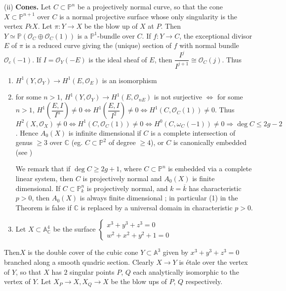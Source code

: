 (ii) \textbf{Cones.} Let $C\subset \mathbb{P}^{n}$ be a projectively normal curve, so that the cone $X\subset \mathbb{P}^{n+1}$ over $C$ is a normal projective surface whose only singularity is the vertex $P\epsilon X$. Let $\pi:Y\to X$ be the blow up of $X$ at $P$. Then $Y\simeq \mathbb{P}(\mathscr{O}_C\oplus \mathscr{O}_C(1))$ is a $\mathbb{P}^{1}$-bundle over $C$. If $f:Y\to C$, the exceptional divisor $E$ of $\pi$ is a reduced curve giving the (unique) section of $f$ with normal bundle $\mathscr{O}_c(-1)$. If $I=\mathscr{O}_Y(-E)$ is the ideal sheaf of $E$, then $\dfrac{I^{j}}{I^{j+1}}\cong\mathscr{O}_C(j)$. Thus 
\begin{enumerate}
\renewcommand{\theenumi}{\roman{enumi}}
\renewcommand{\labelenumi}{(\theenumi)}
\item $H^{1}(Y, \mathscr{O}_Y)\to H^{1}(E, \mathscr{O}_E)$ is an isomorphism 

\item for some $n>1$, $H^{1}(Y, \mathscr{O}_Y)\to H^{1}(E, \mathscr{O}_{n E})$ is not surjective $\Leftrightarrow$ for some $n>1$, $H^{1}\left(\dfrac{E, I}{I^{n}}\right)\neq 0\Leftrightarrow H^{1}\left(\dfrac{E, I}{I^{2}}\right)\neq 0 \Leftrightarrow H^{1}(C, \mathscr{O}_C(1))\neq 0$. Thus $H^{2}(X, \mathscr{O}_X)\neq 0 \Leftrightarrow H^{1}(C, \mathscr{O}_C(1))\neq 0 \Leftrightarrow H^{0}(C, \omega_C(-1))\neq 0 \Rightarrow \deg C\leq 2g -2$. Hence $A_0(X)$ is infinite dimensional if $C$ is a complete intersection of genus $\geq 3$ over $\mathbb{C}$ (eg. $C\subset \mathbb{P}^{2}$ of degree $\geq 4$), or $C$ is canonically embedded (see \cite{Srinivasa})

We remark that if $\deg C\geq 2g+1$, where $C\subset \mathbb{P}^{n}$ is embedded via a complete linear system, then $C$ is projectively normal and $A_0(X)$ is finite dimensional. If $C\subset \mathbb{P}^{n}_k$ is projectively normal, and $k=\overline{k}$ has characteristic $p>0$, then $A_0(X)$ is always finite dimensional \cite{Srinivasa}; in particular (1) in the Theorem is false if $\mathbb{C}$ is replaced by a universal domain in characteristic $p>0$. 

\item  Let $X\subset \mathbb{A}^{4}_{\mathbb{C}}$ be the surface $\begin{cases}
x^{3}+y^{3}+z^{3}=0\\
w^{2}+x^{2}+y^{2}+1=0
\end{cases}
$
\end{enumerate}

Then\pageoriginale $X$ is the double cover of the cubic cone $Y\subset \mathbb{A}^{3}$ given by $x^{3}+y^{3}+z^{3}=0$ branched along a smooth quadric section. Clearly $X\to Y$ is \'{e}tale over the vertex of $Y$, so that $X$ has $2$ singular points $P$, $Q$ each analytically isomorphic to the vertex of $Y$. Let $X_P\to X, X_Q\to X$ be the blow ups of $P$, $Q$ respectively. 


